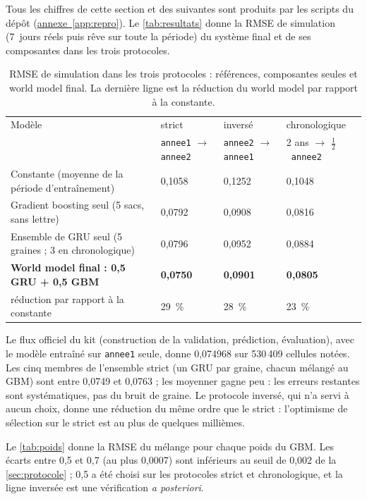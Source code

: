 \documentclass[11pt,a4paper]{article}
\newcommand{\annexeref}[1]{\hyperref[#1]{annexe~\ref*{#1}}}
\begin{document}
Tous les chiffres de cette section et des suivantes sont produits par les scripts du dépôt (\annexeref{app:repro}). Le \autoref{tab:resultats} donne la RMSE de simulation (7~jours réels puis rêve sur toute la période) du système final et de ses composantes dans les trois protocoles.

\begin{table}[htbp]
\centering\small
\caption{RMSE de simulation dans les trois protocoles : références, composantes seules et world model final. La dernière ligne est la réduction du world model par rapport à la constante.}
\label{tab:resultats}
\begin{tabularx}{\textwidth}{Y C{3cm} C{3cm} C{3.2cm}}
\toprule
Modèle & strict & inversé & chronologique \\
 & \texttt{annee1} $\rightarrow$ \texttt{annee2} & \texttt{annee2} $\rightarrow$ \texttt{annee1} & 2 ans $\rightarrow$ $\tfrac{1}{2}$~\texttt{annee2} \\
\midrule
Constante (moyenne de la période d'entraînement) & 0,1058 & 0,1252 & 0,1048 \\
Gradient boosting seul (5 sacs, sans lettre) & 0,0792 & 0,0908 & 0,0816 \\
Ensemble de GRU seul (5 graines ; 3 en chronologique) & 0,0796 & 0,0952 & 0,0884 \\
\textbf{World model final : 0,5 GRU + 0,5 GBM} & \textbf{0,0750} & \textbf{0,0901} & \textbf{0,0805} \\
\midrule
réduction par rapport à la constante & 29~\% & 28~\% & 23~\% \\
\bottomrule
\end{tabularx}
\end{table}

Le flux officiel du kit (construction de la validation, prédiction, évaluation), avec le modèle entraîné sur \texttt{annee1} seule, donne 0,074968 sur 530\,409 cellules notées. Les cinq membres de l'ensemble strict (un GRU par graine, chacun mélangé au GBM) sont entre 0,0749 et 0,0763 ; les moyenner gagne peu : les erreurs restantes sont systématiques, pas du bruit de graine. Le protocole inversé, qui n'a servi à aucun choix, donne une réduction du même ordre que le strict : l'optimisme de sélection sur le strict est au plus de quelques millièmes.

Le \autoref{tab:poids} donne la RMSE du mélange pour chaque poids du GBM. Les écarts entre 0,5 et 0,7 (au plus 0,0007) sont inférieurs au seuil de 0,002 de la \autoref{sec:protocole} ; 0,5 a été choisi sur les protocoles strict et chronologique, et la ligne inversée est une vérification \emph{a posteriori}.
\end{document}
